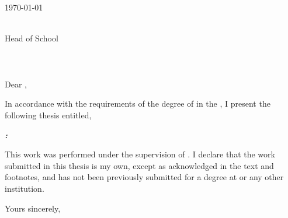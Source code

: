 \documentclass[thesis.tex]{subfiles}
\begin{document}
\makeatletter
\vspace*{10mm}
\begin{flushright}
    \@author\\
    \@email\\
    \today
\end{flushright}
\vspace*{10mm}
\begin{flushleft}
    \@hod\\
    Head of School\\
    \@department\\
    \@university\\
    \@address\\
    \bigskip\bigskip\bigskip
    Dear \@hod,
    \bigskip
\end{flushleft}

\noindent In accordance with the requirements of the degree of \@degree in the \@department, I present the following thesis entitled,

\begin{center}
\bigskip
\textbf{\emph{\@title:\\\@subtitle}}
\bigskip
\end{center}

\noindent This work was performed under the supervision of \@supervisor. I declare that the work submitted in this thesis is my own, except as acknowledged in the text and footnotes, and has not been previously submitted for a degree at \@university or any other institution.

\begin{flushright}
    \bigskip
    Yours sincerely,\\\vspace{0.5in}
    \@author
\end{flushright}
\makeatother
\cleardoublepage
\end{document}
